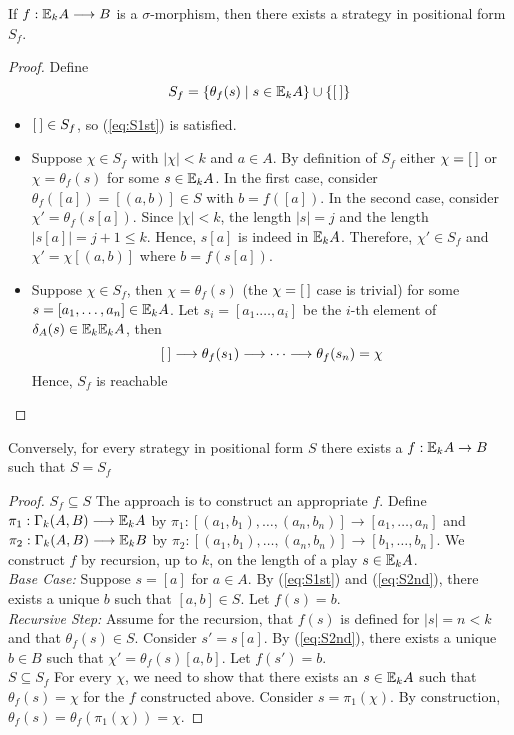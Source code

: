 \begin{prop}
If $f:{\mathbb{E}_{k}A} \longrightarrow B$ is a $\sigma$-morphism, then there exists a strategy in positional form $S_{f}$.
\begin{proof}
Define
$$S_{f} = \{\theta_{f}(s) \mid s \in {\mathbb{E}_{k}A}\} \cup \{{[\:]}\}$$
\begin{itemize}
\item ${[\:]} \in S_{f}$, so (\ref{eq:S1st}) is satisfied.
\item Suppose $\chi \in S_{f}$ with $|\chi| < k$ and $a \in A$. By definition of $S_{f}$ either $\chi = {[\:]}$ or $\chi = \theta_{f}(s)$ for some $s \in {\mathbb{E}_{k}A}$. In the first case, consider $\theta_{f}([a]) = [(a,b)] \in S$ with $b = f([a])$. In the second case, consider $\chi' = \theta_{f}(s[a])$. Since $|\chi| < k$, the length $|s| = j$ and the length $|s[a]| = j+1 \leq k$. Hence, $s[a]$ is indeed in ${\mathbb{E}_{k}A}$. Therefore, $\chi' \in S_{f}$ and $\chi' = \chi[(a,b)]$ where $b = f(s[a])$.  
\item Suppose $\chi \in S_{f}$, then $\chi = \theta_{f}(s)$ (the $\chi = {[\:]}$ case is trivial) for some $s = [a_{1},\dots,a_{n}] \in {\mathbb{E}_{k}A}$. Let $s_{i} = [a_{1}.\dots,a_{i}]$ be the $i$-th element of $\delta_{A}(s) \in {\mathbb{E}_{k}{\mathbb{E}_{k}A}}$, then
$$ {[\:]} \longrightarrow \theta_{f}(s_{1}) \longrightarrow \dots \longrightarrow \theta_{f}(s_{n}) = \chi$$
Hence, $S_{f}$ is reachable
\end{itemize}
\end{proof}
\label{prop:fToPosFormEF}
\end{prop}
\begin{prop}
Conversely, for every strategy in positional form $S$ there exists a $f:{\mathbb{E}_{k}A} \rightarrow B$ such that $S = S_{f}$
\begin{proof}
$S_{f} \subseteq S$ The approach is to construct an appropriate $f$. Define $\pi_{1}:\Gamma_{k}(A,B) \longrightarrow {\mathbb{E}_{k}A}$ by $\pi_{1}:[(a_{1},b_{1}),\dots,(a_{n},b_{n})] \longrightarrow [a_{1},\dots,a_{n}]$ and $\pi_{2}:\Gamma_{k}(A,B) \longrightarrow {\mathbb{E}_{k}B}$ by $\pi_{2}:[(a_{1},b_{1}),\dots,(a_{n},b_{n})] \longrightarrow [b_{1},\dots,b_{n}]$. We construct $f$ by recursion, up to $k$, on the length of a play $s \in {\mathbb{E}_{k}A}$. \\ 
\textit{Base Case:} Suppose $s = [a]$ for $a \in A$. By (\ref{eq:S1st}) and (\ref{eq:S2nd}), there exists a unique $b$ such that $[a,b] \in S$. Let $f(s) = b$. \\    
\textit{Recursive Step:} Assume for the recursion, that $f(s)$ is defined for $|s| = n < k$ and that $\theta_{f}(s) \in S$. Consider $s' = s[a]$. By (\ref{eq:S2nd}), there exists a unique $b \in B$ such that $\chi' = \theta_{f}(s)[a,b]$. Let $f(s') = b$. \\      
$S \subseteq S_{f}$ For every $\chi$, we need to show that there exists an $s \in {\mathbb{E}_{k}A}$ such that $\theta_{f}(s) = \chi$ for the $f$ constructed above. Consider $s = \pi_{1}(\chi)$. By construction, $\theta_{f}(s) = \theta_{f}(\pi_{1}(\chi)) = \chi$.
\end{proof}
\label{prop:posFormToFEF}
\end{prop}
